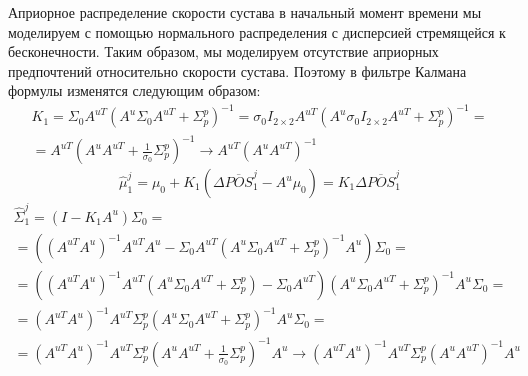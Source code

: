 Априорное распределение скорости сустава в начальный момент времени мы моделируем с помощью нормального распределения с дисперсией стремящейся к бесконечности. Таким образом, мы моделируем отсутствие априорных предпочтений относительно скорости сустава. Поэтому в фильтре Калмана формулы изменятся следующим образом:
\begin{multline}
	K_1 = \Sigma_0 A^{uT}\left(A^u \Sigma_0 A^{uT} + \Sigma_p^p\right)^{-1} =
	\sigma_0 I_{2\times2} A^{uT} \left(A^u \sigma_0 I_{2\times2} A^{uT} +
	\Sigma_p^p\right)^{-1} = \\ = 
	A^{uT} \left(A^u A^{uT} + \frac{1}{\sigma_0}\Sigma_p^p\right)^{-1} \rightarrow
	A^{uT} \left(A^u A^{uT}\right)^{-1}
\end{multline}
\[
\hat{\mu}_1^j = \mu_0 + K_1 \left( \Delta \overline{POS}_1^j - A^u \mu_0 \right) =
K_1 \Delta \overline{POS}_1^j
\]
\begin{multline}
	\hat{\Sigma}_1^j = \left(I - K_1 A^u \right) \Sigma_0 = \\ =
	\left(\left(A^{uT} A^u\right)^{-1} A^{uT} A^u - \Sigma_0 A^{uT}
	\left( A^u \Sigma_0 A^{uT} + \Sigma_p^p \right)^{-1} A^u \right) \Sigma_0 = \\ =
	\left(\left(A^{uT} A^u\right)^{-1} A^{uT} \left( A^u \Sigma_0 A^{uT} + \Sigma_p^p \right)
	- \Sigma_0 A^{uT}\right)
	\left( A^u \Sigma_0 A^{uT} + \Sigma_p^p \right)^{-1} A^u \Sigma_0 = \\ =
	\left(A^{uT} A^u\right)^{-1} A^{uT} \Sigma_p^p
	\left( A^u \Sigma_0 A^{uT} + \Sigma_p^p \right)^{-1} A^u \Sigma_0 = \\ =
	\left(A^{uT} A^u\right)^{-1} A^{uT} \Sigma_p^p
	\left(A^u A^{uT} + \frac{1}{\sigma_0} \Sigma_p^p \right)^{-1} A^u \rightarrow
	\left(A^{uT} A^u\right)^{-1} A^{uT} \Sigma_p^p \left(A^u A^{uT}\right)^{-1} A^u
\end{multline}

